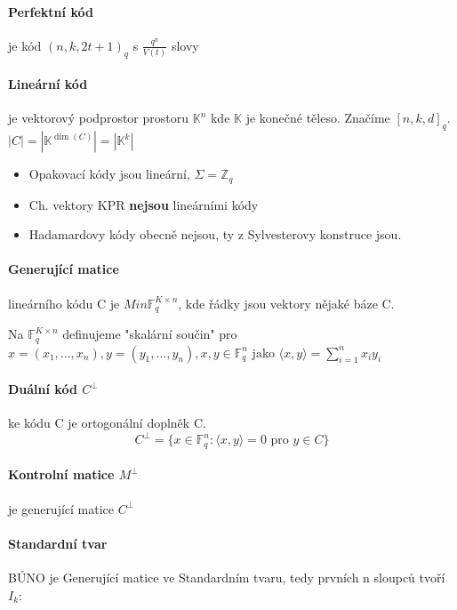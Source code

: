 \documentclass[10pt,a4paper]{article}
\theoremstyle{plain}
\begin{document}
\paragraph{Perfektní kód} je kód $(n,k,2t+1)_q$ s $\frac{q^n}{V(t)}$ slovy

\paragraph{Lineární kód} je vektorový podprostor prostoru $\mathbb{K}^n$ kde $\mathbb{K}$ je konečné těleso. 
Značíme $[n,k,d]_q$. $|C| = |\mathbb{K}^{\dim(C)}| = |\mathbb{K}^{k}|$

\begin{itemize}
\item Opakovací kódy jsou lineární, $\Sigma = \mathbb{Z}_q$
\item Ch. vektory KPR \textbf{nejsou} lineárními kódy
\item Hadamardovy kódy obecně nejsou, ty z Sylvesterovy konstruce jsou.
\end{itemize}

\paragraph{Generující matice}  lineárního kódu C je $M in \mathbb{F}_q^{K\times n}$, kde řádky jsou vektory nějaké báze C.

Na $\mathbb{F}_q^{K\times n}$ definujeme "skalární součin" pro $x=(x_1,...,x_n), y=(y_1, ..., y_n), x,y \in\mathbb{F}_q^{n}$ jako $\langle x,y \rangle = \sum^n_{i=1} x_i y_i$

\paragraph{Duální kód $C^\perp$} ke kódu C je ortogonální doplněk C.
\[ C^\perp = \{ x \in \mathbb{F}_q^{n} : \langle x,y \rangle = 0 \text{ pro } y \in C \} \]

\paragraph{Kontrolní matice $M^\perp$} je generující matice $C^\perp$

\paragraph{Standardní tvar} BÚNO je Generující matice ve Standardním tvaru, tedy prvních n sloupců tvoří $I_k$:
\end{document}
